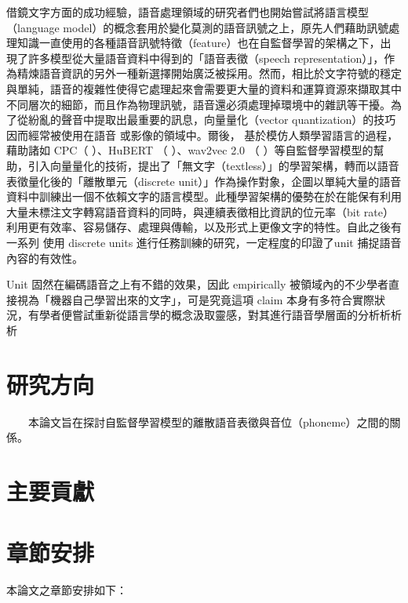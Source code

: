     借鏡文字方面的成功經驗，語音處理領域的研究者們也開始嘗試將語言模型（language model）的概念套用於變化莫測的語音訊號之上，原先人們藉助訊號處理知識一直使用的各種語音訊號特徵（feature）也在自監督學習的架構之下，出現了許多模型從大量語音資料中得到的「語音表徵（speech representation）」，作為精煉語音資訊的另外一種新選擇開始廣泛被採用。然而，相比於文字符號的穩定與單純，語音的複雜性使得它處理起來會需要更大量的資料和運算資源來擷取其中不同層次的細節，而且作為物理訊號，語音還必須處理掉環境中的雜訊等干擾。為了從紛亂的聲音中提取出最重要的訊息，向量量化（vector quantization）的技巧因而經常被使用在語音 \cite{chorowski2019unsupervised, chen2023vector, zhao2023speech} 或影像的領域中。爾後， \cite{lakhotia2021generative}  基於模仿人類學習語言的過程，藉助諸如 CPC（\cite{oord2019representation} ）、HuBERT （\cite{hsu2021hubert} ）、wav2vec 2.0 （\cite{baevski2020wav2vec} ）等自監督學習模型的幫助，引入向量量化的技術，提出了「無文字（textless）」的學習架構，轉而以語音表徵量化後的「離散單元（discrete unit）」作為操作對象，企圖以單純大量的語音資料中訓練出一個不依賴文字的語言模型。此種學習架構的優勢在於在能保有利用大量未標注文字轉寫語音資料的同時，與連續表徵相比資訊的位元率（bit rate）利用更有效率、容易儲存、處理與傳輸，以及形式上更像文字的特性。自此之後有一系列   使用 discrete units 進行任務訓練的研究，一定程度的印證了unit 捕捉語音內容的有效性。
    
    Unit 固然在編碼語音之上有不錯的效果，因此 empirically 被領域內的不少學者直接視為「機器自己學習出來的文字」，可是究竟這項 claim 本身有多符合實際狀況，有學者便嘗試重新從語言學的概念汲取靈感，對其進行語音學層面的分析析析析 
    

\section{研究方向}

　　本論文旨在探討自監督學習模型的離散語音表徵與音位（phoneme）之間的關係。

\section{主要貢獻}
\section{章節安排}

本論文之章節安排如下：

